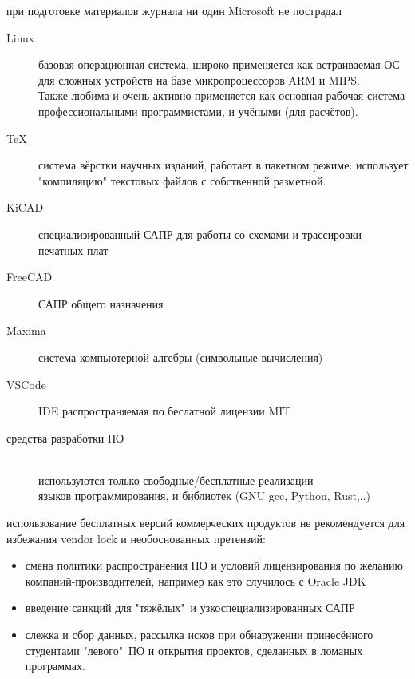 \label{linux}\secdown

\clearpage
{}

при подготовке материалов журнала ни один Microsoft не пострадал

\begin{description}

    \item[Linux] базовая операционная система, широко применяется как
    встраиваемая ОС для сложных устройств на базе микропроцессоров ARM и
    MIPS.\\Также любима и очень активно применяется как основная рабочая система
    профессиональными программистами, и учёными (для расчётов).

    \item[\TeX] система вёрстки научных изданий, работает в пакетном режиме:
    использует "компиляцию" текстовых файлов с собственной разметной.

    \item[KiCAD] специализированный САПР для работы со схемами и трассировки
    печатных плат

    \item[FreeCAD] САПР общего назначения

    \item[Maxima] система компьютерной алгебры (символьные вычисления)
    
    \item[VSCode] IDE распространяемая по беслатной лицензии MIT

    \item[средства разработки ПО]\ \\используются только свободные/бесплатные
    реализации\\ языков программирования, и библиотек (GNU gcc, Python, Rust,..)

\end{description}

\noindent
использование бесплатных версий коммерческих продуктов не рекомендуется для
избежания vendor lock и необоснованных претензий:
\begin{itemize}[nosep]
\item смена политики распространения ПО и условий лицензирования по желанию
компаний-производителей, например как это случилось с Oracle JDK
\item введение санкций для "тяжёлых"\ и узкоспециализированных САПР
\item слежка и сбор данных, рассылка исков при обнаружении принесённого
студентами "левого"\ ПО и открытия проектов, сделанных в ломаных программах.
\end{itemize}

